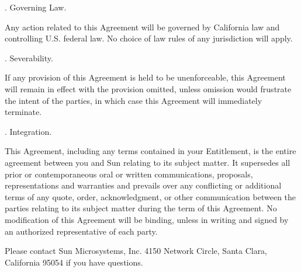 \bigskip 
\par {}.     Governing Law. 
\bigskip 
\par \noindent Any action related to this Agreement will be governed by California law and controlling U.S. federal law. No choice of law rules of any jurisdiction will apply. 
\bigskip 
\par {}.     Severability. 
\bigskip 
\par \noindent If any provision of this Agreement is held to be unenforceable, this Agreement will remain in effect with the provision omitted, unless omission would frustrate the intent of the parties, in which case this Agreement will immediately terminate.
\bigskip 
\par {}.     Integration. 
\bigskip 
\par \noindent This Agreement, including any terms contained in your Entitlement, is the entire agreement between you and Sun relating to its subject matter. It supersedes all prior or contemporaneous oral or written communications, proposals, representations and warranties and prevails over any conflicting or additional terms of any quote, order, acknowledgment, or other communication between the parties relating to its subject matter during the term of this Agreement. No modification of this Agreement will be binding, unless in writing and signed by an authorized representative of each party.
\bigskip 
\par \noindent Please contact Sun Microsystems, Inc. 4150 Network Circle, Santa Clara, California 95054 if you have questions.
\bigskip 
